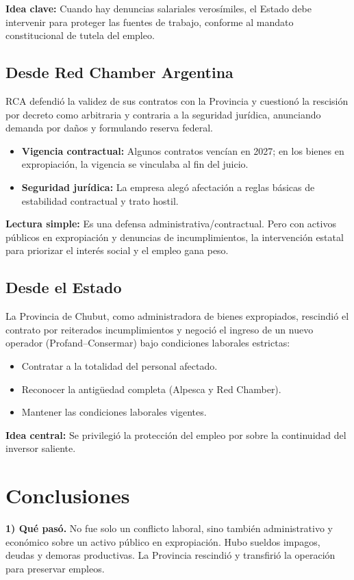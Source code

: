 \documentclass[]{informeutn}
\begin{document}
\noindent\textbf{Idea clave:} Cuando hay denuncias salariales verosímiles, el Estado debe intervenir para proteger
las fuentes de trabajo, conforme al mandato constitucional de tutela del empleo.

\section{Desde Red Chamber Argentina}
RCA defendió la validez de sus contratos con la Provincia y cuestionó la rescisión por decreto como arbitraria
y contraria a la seguridad jurídica, anunciando demanda por daños y formulando reserva federal.

\begin{itemize}
  \item \textbf{Vigencia contractual:} Algunos contratos vencían en 2027; en los bienes en expropiación, la vigencia
  se vinculaba al fin del juicio.
  \item \textbf{Seguridad jurídica:} La empresa alegó afectación a reglas básicas de estabilidad contractual y trato hostil.
\end{itemize}

\noindent\textbf{Lectura simple:} Es una defensa administrativa/contractual. Pero con activos públicos en expropiación
y denuncias de incumplimientos, la intervención estatal para priorizar el interés social y el empleo gana peso.

\section{Desde el Estado}
La Provincia de Chubut, como administradora de bienes expropiados, rescindió el contrato por reiterados
incumplimientos y negoció el ingreso de un nuevo operador (Profand--Consermar) bajo condiciones laborales estrictas:

\begin{itemize}
  \item Contratar a la totalidad del personal afectado.
  \item Reconocer la antigüedad completa (Alpesca y Red Chamber).
  \item Mantener las condiciones laborales vigentes.
\end{itemize}

\noindent\textbf{Idea central:} Se privilegió la protección del empleo por sobre la continuidad del inversor saliente.

\chapter{Conclusiones}
\textbf{1) Qué pasó.} No fue solo un conflicto laboral, sino también administrativo y económico sobre un activo
público en expropiación. Hubo sueldos impagos, deudas y demoras productivas. La Provincia rescindió y transfirió
la operación para preservar empleos.
\end{document}
